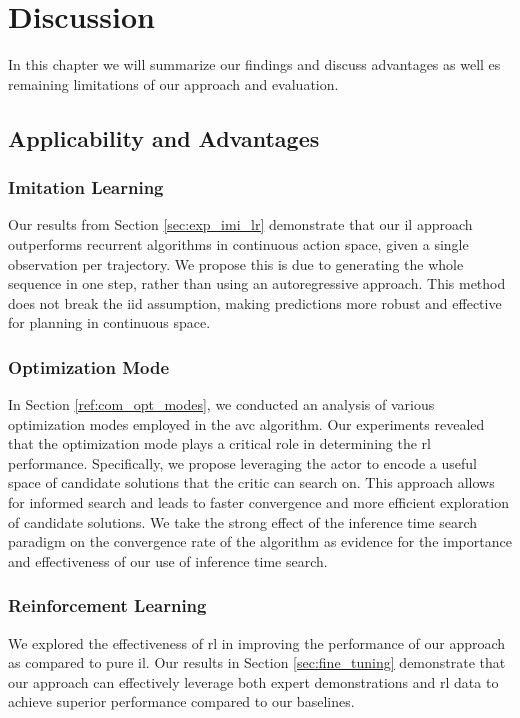 
\chapter{Discussion}
\label{chapter:Discussion}
In this chapter we will summarize our findings and discuss advantages as well es remaining limitations of our approach and evaluation.
\section{Applicability and Advantages}
\subsection{Imitation Learning}
Our results from Section \ref{sec:exp_imi_lr} demonstrate that our \ac{il} approach outperforms recurrent algorithms in continuous action space, 
given a single observation per trajectory. We propose this is due to generating the whole sequence in one step, 
rather than using an autoregressive approach. This method does not break the \ac{iid} assumption, making predictions more robust and effective 
for planning in continuous space. \\

\subsection{Optimization Mode}
In Section \ref{ref:com_opt_modes}, we conducted an analysis of various optimization modes employed in the \ac{avc} algorithm. 
Our experiments revealed that the optimization mode plays a critical role in determining the \ac{rl} performance. 
Specifically, we propose leveraging the actor to encode a useful space of candidate solutions that the critic can search on. 
This approach allows for informed search and leads to faster convergence and more efficient exploration of candidate solutions. We take the strong effect of the inference time 
search paradigm on the convergence rate of the algorithm as evidence for the importance and effectiveness of our use of inference time search.

\subsection{Reinforcement Learning}
We explored the effectiveness of \ac{rl} in improving the performance of our approach as compared to pure \ac{il}. 
Our results in Section \ref{sec:fine_tuning} demonstrate that our approach can effectively leverage both expert demonstrations and \ac{rl} data to achieve 
superior performance compared to our baselines.\\

